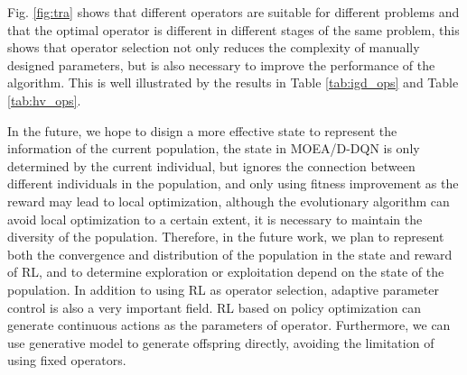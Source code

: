 \documentclass[journal]{IEEEtran}
\begin{document}
Fig. \ref{fig:tra} shows that different operators are suitable for different problems and that the optimal operator is different in different stages of the same problem, this shows that operator selection not only reduces the complexity of manually designed parameters, but is also necessary to improve the performance of the algorithm.
This is well illustrated by the results in Table \ref{tab:igd_ops} and Table \ref{tab:hv_ops}.

In the future, we hope to disign a more effective state to represent the information of the current population, the state in MOEA/D-DQN is only determined by the current individual, but ignores the connection between different individuals in the population, and only using fitness improvement as the reward may lead to local optimization, although the evolutionary algorithm can avoid local optimization to a certain extent, it is necessary to maintain the diversity of the population. Therefore, in the future work, we plan to represent both the convergence and distribution of the population in the state and reward of RL, and to determine exploration or exploitation depend on the state of the population.
In addition to using RL as operator selection, adaptive parameter control is also a very important field. RL based on policy optimization can generate continuous actions as the parameters of operator. Furthermore, we can use generative model to generate offspring directly, avoiding the limitation of using fixed operators.


\ifCLASSOPTIONcaptionsoff
  \newpage
\fi



\end{document}
